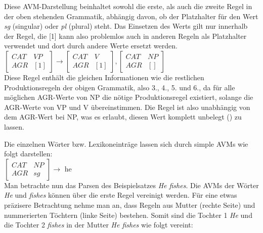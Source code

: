 \documentclass[12pt]{report}
\begin{document}
Diese AVM-Darstellung beinhaltet sowohl die erste, als auch die zweite Regel in der oben stehenden Grammatik, abhängig davon, ob der Platzhalter \textit{\glqq  [1]\grqq{}} für den Wert \textit{\glqq  sg\grqq{}} (singular) oder \textit{\glqq  pl\grqq{}} (plural) steht. Das Einsetzen des Werts gilt nur innerhalb der Regel, die [1] kann also problemlos auch in anderen Regeln als Platzhalter verwendet und dort durch andere Werte ersetzt werden.\\

$\begin{bmatrix} 
CAT & VP \\
AGR & [1]
\end{bmatrix} 
\rightarrow
\begin{bmatrix} 
CAT & V \\
AGR & [1]
\end{bmatrix},
\begin{bmatrix} 
CAT & NP \\
AGR & [] 
\end{bmatrix}$ \\

Diese Regel enthält die gleichen Informationen wie die restlichen Produktionsregeln der obigen Grammatik, also 3., 4., 5. und 6., da für alle möglichen AGR-Werte von NP die nötige Produktionsregel existiert, solange die AGR-Werte von VP und V übereinstimmen. Die Regel ist also unabhängig von dem AGR-Wert bei NP, was es erlaubt, diesen Wert komplett unbelegt (\glqq  []\grqq{}) zu lassen.

Die einzelnen Wörter bzw. Lexikoneinträge lassen sich durch simple AVMs wie folgt darstellen:\\

$\begin{bmatrix} 
CAT & NP \\
AGR & sg
\end{bmatrix}\rightarrow$ he \\

Man betrachte nun das Parsen des Beispielsatzes \textit{\glqq  He fishes\grqq{}}. Die AVMs der Wörter \textit{He} und \textit{fishes} können über die erste Regel vereinigt werden. Für eine etwas präzisere Betrachtung nehme man an, dass Regeln aus Mutter (rechte Seite) und nummerierten Töchtern (linke Seite) bestehen. Somit sind die Tochter 1 \textit{He} und die Tochter 2 \textit{fishes} in der Mutter \textit{He fishes} wie folgt vereint:\\
\end{document}

